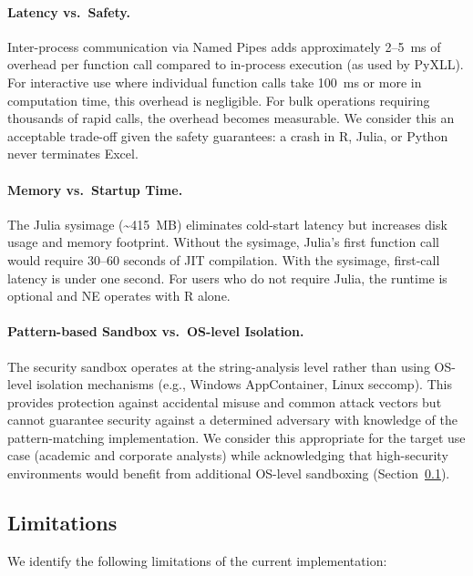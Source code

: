 \documentclass[preprint,12pt,authoryear]{elsarticle}
\newcommand{\neven}{NE\raisebox{0.2ex}{v}\rotatebox[origin=c]{180}{E}\rotatebox[origin=c]{180}{N}}
\begin{document}
\paragraph{Latency vs.\ Safety.} Inter-process communication via Named Pipes adds approximately 2--5~ms of overhead per function call compared to in-process execution (as used by PyXLL). For interactive use where individual function calls take 100~ms or more in computation time, this overhead is negligible. For bulk operations requiring thousands of rapid calls, the overhead becomes measurable. We consider this an acceptable trade-off given the safety guarantees: a crash in R, Julia, or Python never terminates Excel.

\paragraph{Memory vs.\ Startup Time.} The Julia sysimage (\textasciitilde415~MB) eliminates cold-start latency but increases disk usage and memory footprint. Without the sysimage, Julia's first function call would require 30--60 seconds of JIT compilation. With the sysimage, first-call latency is under one second. For users who do not require Julia, the runtime is optional and \neven{} operates with R alone.

\paragraph{Pattern-based Sandbox vs.\ OS-level Isolation.} The security sandbox operates at the string-analysis level rather than using OS-level isolation mechanisms (e.g., Windows AppContainer, Linux seccomp). This provides protection against accidental misuse and common attack vectors but cannot guarantee security against a determined adversary with knowledge of the pattern-matching implementation. We consider this appropriate for the target use case (academic and corporate analysts) while acknowledging that high-security environments would benefit from additional OS-level sandboxing (Section~\ref{sec:limitations}).

\subsection{Limitations}
\label{sec:limitations}

We identify the following limitations of the current implementation:
\end{document}
